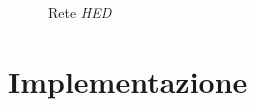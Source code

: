 \begin{figure}[h]
{{{				
			}
		}
	}
	\caption{Rete \textit{HED}} \label{fig:hed}
\end{figure}

\section{Implementazione}
